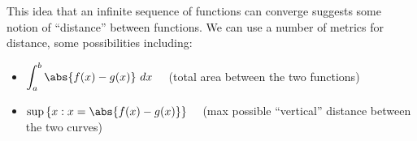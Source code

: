 This idea that an infinite sequence of functions can converge suggests some notion of ``distance'' between functions. We can use a number of metrics for distance, some possibilities including:
\begin{itemize}
    \item \( \displaystyle \int_a^b \abs{f(x) - g(x)}\ dx \quad \) (total area between the two functions)
    \item \( \displaystyle \sup \left\{ x : x = \abs{f(x) - g(x)} \right\} \quad \) (max possible ``vertical'' distance between the two curves)
\end{itemize}
